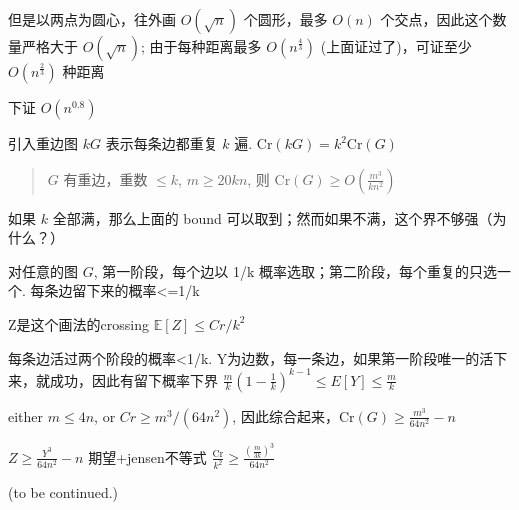 但是以两点为圆心，往外画 $O(\sqrt{n})$ 个圆形，最多 $O(n)$ 个交点，因此这个数量严格大于 $O(\sqrt{n})$; 由于每种距离最多 $O(n^{\frac{4}{3}})$ (上面证过了)，可证至少 $O(n^{\frac{2}{3}})$ 种距离

下证 $O(n^{0.8})$

引入重边图 $kG$ 表示每条边都重复 $k$ 遍. $\text{Cr}(kG)= k^2\text{Cr}(G)$

\begin{quotation}
$G$ 有重边，重数 $\leq k$, $m\geq 20kn$, 则 $\text{Cr}(G)\geq O(\frac{m^3}{kn^2})$
\end{quotation}

如果 $k$ 全部满，那么上面的 bound 可以取到；然而如果不满，这个界不够强（为什么？）

对任意的图 $G$, 第一阶段，每个边以 1/k 概率选取；第二阶段，每个重复的只选一个. 每条边留下来的概率<=1/k

Z是这个画法的crossing $\mathbb{E}[Z]\leq Cr/k^2$

每条边活过两个阶段的概率<1/k. Y为边数，每一条边，如果第一阶段唯一的活下来，就成功，因此有留下概率下界 $\frac{m}{k}(1-\frac{1}{k})^{k-1}\leq E[Y]\leq \frac{m}{k}$

either $m\leq4n$, or $Cr\geq m^3/(64n^2)$, 因此综合起来，$\text{Cr}(G)\geq\frac{m^3}{64n^2}-n$

$Z\geq\frac{Y^3}{64n^2}-n$ 期望+jensen不等式 $\frac{\text{Cr}}{k^2}\geq \frac{(\frac{m}{3k})^3}{64n^2}$

(to be continued.)
